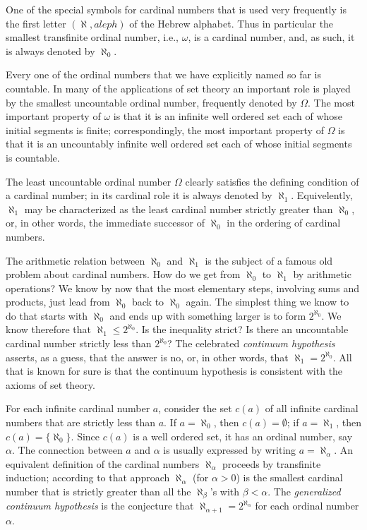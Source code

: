 One of the special symbols for cardinal numbers that is used very frequently is the first letter $(\aleph, aleph)$ of the Hebrew alphabet. Thus in particular the smallest transfinite ordinal number, i.e., $\omega$, is a cardinal number, and, as such, it is always denoted by $\aleph_{0}$.

Every one of the ordinal numbers that we have explicitly named so far is countable. In many of the applications of set theory an important role is played by the smallest uncountable ordinal number, frequently denoted by $\Omega$. The most important property of $\omega$ is that it is an infinite well ordered set each of whose initial segments is finite; correspondingly, the most important property of $\Omega$ is that it is an uncountably infinite well ordered set each of whose initial segments is countable. 

The least uncountable ordinal number $\Omega$ clearly  satisfies the defining condition of a cardinal number; in its cardinal role it is always denoted by $\aleph_{1}$. Equivelently, $\aleph_{1}$ may be characterized as the least cardinal number strictly greater than $\aleph_{0}$, or, in other words, the immediate successor of $\aleph_{0}$ in the ordering of cardinal numbers. 

The arithmetic relation between $\aleph_{0}$ and $\aleph_{1}$ is the subject of a famous old problem about cardinal numbers. How do we get from $\aleph_{0}$ to $\aleph_{1}$ by arithmetic operations? We know by now that the most elementary steps, involving sums and products, just lead from $\aleph_{0}$ back to $\aleph_{0}$ again. The simplest thing we know to do that starts with $\aleph_{0}$ and ends up with something larger is to form $2^{\aleph_{0}}$. We know therefore that $\aleph_{1} \le 2^{\aleph_{0}}$. Is the inequality strict? Is there an uncountable cardinal number strictly less than $2^{\aleph_{0}}$? The celebrated \textit{continuum hypothesis} asserts, as a guess, that the answer is no, or, in other words, that $\aleph_{1} = 2^{\aleph_{0}}$. All that is known for sure is that the continuum hypothesis is consistent with the axioms of set theory. 

For each infinite cardinal number $a$, consider the set $c(a)$ of all infinite cardinal numbers that are strictly less than $a$. If $a = \aleph_{0}$, then $c(a) = \emptyset$; if $a = \aleph_{1}$, then $c(a) = \{ \aleph_{0} \}$. Since $c(a)$ is a well ordered set, it has an ordinal number, say $\alpha$. The connection between $a$ and $\alpha$ is usually expressed by writing $a = \aleph_{\alpha}$. An equivalent definition of the cardinal numbers $\aleph_{\alpha}$ proceeds by transfinite induction; according to that approach $\aleph_{\alpha}$ (for $\alpha > 0$) is the smallest cardinal number that is strictly greater than all the $\aleph_{\beta}$'s with $\beta < \alpha$. The \textit{generalized continuum hypothesis} is the conjecture that $\aleph_{\alpha + 1} = 2^{\aleph_{\alpha}}$ for each ordinal number $\alpha$.
